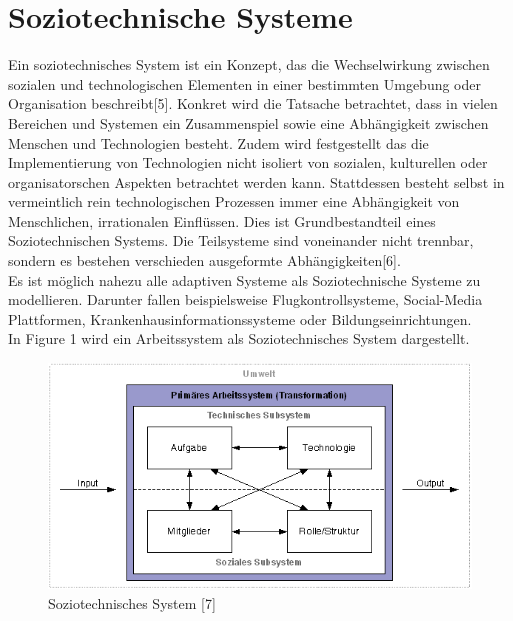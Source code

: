\documentclass[journal=tosc,final]{iacrtrans}
\begin{document}
\section{Soziotechnische Systeme}
Ein soziotechnisches System ist ein Konzept, das die Wechselwirkung zwischen sozialen und technologischen Elementen in einer bestimmten Umgebung oder Organisation beschreibt[5]. Konkret wird die Tatsache betrachtet, dass in vielen Bereichen und Systemen ein Zusammenspiel sowie eine Abhängigkeit zwischen Menschen und Technologien besteht. Zudem wird festgestellt das die Implementierung von Technologien nicht isoliert von sozialen, kulturellen oder organisatorschen Aspekten betrachtet werden kann. Stattdessen besteht selbst in vermeintlich rein technologischen Prozessen immer eine Abhängigkeit von Menschlichen, irrationalen Einflüssen. Dies ist Grundbestandteil eines Soziotechnischen Systems. Die Teilsysteme sind voneinander nicht trennbar, sondern es bestehen verschieden ausgeformte Abhängigkeiten[6].\\
Es ist möglich nahezu alle adaptiven Systeme als Soziotechnische Systeme zu modellieren. Darunter fallen beispielsweise Flugkontrollsysteme, Social-Media Plattformen, Krankenhausinformationssysteme oder Bildungseinrichtungen.\\
In Figure 1 wird ein Arbeitssystem als Soziotechnisches System dargestellt.
\begin{figure}[h]
\caption{Soziotechnisches System [7]}
\begin{center}
 \includegraphics[scale=0.5]{sozio.png}
\end{center}
\end{figure}
\end{document}

